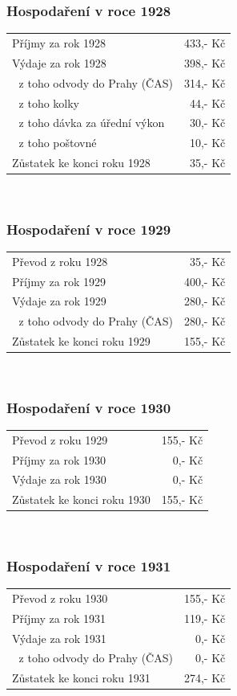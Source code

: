 \documentclass[10pt,a5paper,twoside]{book}
\begin{document}
\subsubsection*{Hospodaření v roce 1928}
\begin{tabular}{p{9cm} r}
Příjmy za rok 1928	&433,- Kč\\
Výdaje za rok 1928	&398,- Kč\\
$\;$    z toho odvody do Prahy (ČAS)	&314,- Kč\\
$\;$    z toho kolky	  &44,- Kč\\
$\;$    z toho dávka za úřední výkon	  &30,- Kč\\
$\;$    z toho poštovné	  &10,- Kč\\
Zůstatek ke konci roku 1928	  &35,- Kč\\
\end{tabular}
\\
\subsubsection*{Hospodaření v roce 1929}
\begin{tabular}{p{9cm} r}
Převod z roku 1928	  &35,- Kč\\
Příjmy za rok 1929	&400,- Kč\\
Výdaje za rok 1929	&280,- Kč\\
$\;$    z toho odvody do Prahy (ČAS)	&280,- Kč\\
Zůstatek ke konci roku 1929&	155,- Kč\\
\end{tabular}
\\
\subsubsection*{Hospodaření v roce 1930}
\begin{tabular}{p{9cm} r}
Převod z roku 1929	&155,- Kč\\
Příjmy za rok 1930	   & 0,- Kč\\
Výdaje za rok 1930	    &0,- Kč\\
Zůstatek ke konci roku 1930	&155,- Kč\\
\end{tabular}
\\
\subsubsection*{Hospodaření v roce 1931}
\begin{tabular}{p{9cm} r}
Převod z roku 1930	&155,- Kč\\
Příjmy za rok 1931	&119,- Kč\\
Výdaje za rok 1931	    &0,- Kč\\
$\;$    z toho odvody do Prahy (ČAS)	    &0,- Kč\\
Zůstatek ke konci roku 1931	&274,- Kč\\
\end{tabular}
\end{document}
